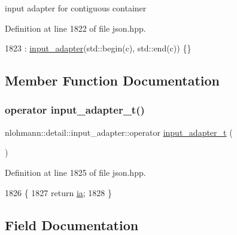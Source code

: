 input adapter for contiguous container 



Definition at line 1822 of file json.\+hpp.


\begin{DoxyCode}
1823         : \hyperlink{classnlohmann_1_1detail_1_1input__adapter_ae89f11268d4724b3080473f7218abe86}{input\_adapter}(std::begin(c), std::end(c)) \{\}
\end{DoxyCode}


\subsection{Member Function Documentation}
\mbox{\label{classnlohmann_1_1detail_1_1input__adapter_a4ef04b9490247fc38f3d1c2a9e18789b}} 
\subsubsection{\texorpdfstring{operator input\+\_\+adapter\+\_\+t()}{operator input\_adapter\_t()}}
{\footnotesize\ttfamily nlohmann\+::detail\+::input\+\_\+adapter\+::operator \hyperlink{namespacenlohmann_1_1detail_ae132f8cd5bb24c5e9b40ad0eafedf1c2}{input\+\_\+adapter\+\_\+t} (\begin{DoxyParamCaption}{ }\end{DoxyParamCaption})\hspace{0.3cm}{\ttfamily [inline]}}



Definition at line 1825 of file json.\+hpp.


\begin{DoxyCode}
1826     \{
1827         \textcolor{keywordflow}{return} \hyperlink{classnlohmann_1_1detail_1_1input__adapter_ad5a11d0b65b68f6950cfbe8c8366b7da}{ia};
1828     \}
\end{DoxyCode}


\subsection{Field Documentation}
\mbox{\label{classnlohmann_1_1detail_1_1input__adapter_ad5a11d0b65b68f6950cfbe8c8366b7da}} 
